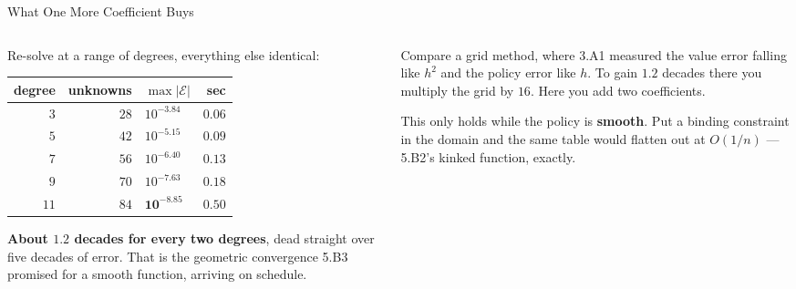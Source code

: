 \begin{frame}{What One More Coefficient Buys}
\begin{columns}[T]
\begin{column}{0.5\textwidth}
\small
Re-solve at a range of degrees, everything else identical:
\medskip
\begin{center}\footnotesize
\begin{tabularx}{\linewidth}{@{}r r >{\raggedleft\arraybackslash}X r@{}}
\toprule
degree & unknowns & $\max|\mathcal{E}|$ & sec \\
\midrule
$3$ & $28$ & $10^{-3.84}$ & $0.06$ \\
$5$ & $42$ & $10^{-5.15}$ & $0.09$ \\
$7$ & $56$ & $10^{-6.40}$ & $0.13$ \\
$9$ & $70$ & $10^{-7.63}$ & $0.18$ \\
$11$ & $84$ & $\mathbf{10^{-8.85}}$ & $0.50$ \\
\bottomrule
\end{tabularx}
\end{center}
\medskip
\textbf{About $1.2$ decades for every two degrees}, dead straight over five decades of error. That is the geometric convergence 5.B3 promised for a smooth function, arriving on schedule.
\end{column}
\begin{column}{0.47\textwidth}
\begin{takeawaybox}\footnotesize
Compare a grid method, where 3.A1 measured the value error falling like $h^{2}$ and the policy error like $h$. To gain $1.2$ decades there you multiply the grid by $16$. Here you add two coefficients.
\end{takeawaybox}
\medskip
\begin{cautionbox}\footnotesize
This only holds while the policy is \textbf{smooth}. Put a binding constraint in the domain and the same table would flatten out at $O(1/n)$ --- 5.B2's kinked function, exactly.
\end{cautionbox}
\end{column}
\end{columns}
\vspace{1mm}
\end{frame}


